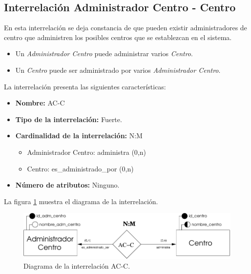 \subsection{Interrelación Administrador Centro - Centro}

   \begin{description}
      \item[Definición] En esta interrelación se deja constancia de que pueden
      existir administradores de centro que administren los posibles centros
      que se establezcan en el sistema.

      \begin{itemize}
       \item Un \textit{Administrador Centro} puede administrar varios \textit{Centro}.
       \item Un \textit{Centro} puede ser administrado por varios
       \textit{Administrador Centro}.
      \end{itemize}

      \item[Características] La interrelación presenta las siguientes
                             características:

         \begin{itemize}
            \item \textbf{Nombre:} AC-C
            \item \textbf{Tipo de la interrelación:} Fuerte.
            \item \textbf{Cardinalidad de la interrelación:} N:M
                  \begin{itemize}
                     \item Administrador Centro: administra (0,n)
                     \item Centro: es\_administrado\_por (0,n)
                  \end{itemize}
            \item \textbf{Número de atributos:} Ninguno.
         \end{itemize}

      \item[Diagrama] La figura \ref{diagramaAC-C} muestra el diagrama de la
                      interrelación.
      \item \begin{figure}[!ht]
            \begin{center}
            \includegraphics[]{07.Modelo_Entidad-Interrelacion/7.3.Analisis_Interrelaciones/diagramas/AC-C.pdf}
            \caption{Diagrama de la interrelación AC-C.}
            \label{diagramaAC-C}
            \end{center}
         \end{figure}


\end{description}
